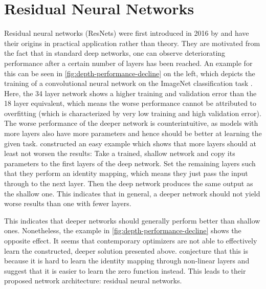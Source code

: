 \section{Residual Neural Networks}
\label{sec:neural-networks}

Residual neural networks (ResNets) were first introduced in 2016 by \citet{he16} and have their origins in practical application rather than theory.
They are motivated from the fact that in standard deep networks, one can observe deteriorating performance after a certain number of layers has been reached.
An example for this can be seen in \cref{fig:depth-performance-decline} on the left, which depicts the training of a convolutional neural network on the ImageNet classification task \cite{deng09}.
Here, the 34 layer network shows a higher training and validation error than the 18 layer equivalent, which means the worse performance cannot be attributed to overfitting (which is characterized by very low training and high validation error). 
The worse performance of the deeper network is counterintuitive, as models with more layers also have more parameters and hence should be better at learning the given task.
\citet{he16} constructed an easy example which shows that more layers should at least not worsen the results:
Take a trained, shallow network and copy its parameters to the first layers of the deep network.
Set the remaining layers such that they perform an identity mapping, which means they just pass the input through to the next layer.
Then the deep network produces the same output as the shallow one.
This indicates that in general, a deeper network should not yield worse results than one with fewer layers.




This indicates that deeper networks should generally perform better than shallow ones.
Nonetheless, the example in \cref{fig:depth-performance-decline} shows the opposite effect.
It seems that contemporary optimizers are not able to effectively learn the constructed, deeper solution presented above.
\citet{he16} conjecture that this is because it is hard to learn the identity mapping through non-linear layers and suggest that it is easier to learn the zero function instead.
This leads to their proposed network architecture: residual neural networks.


